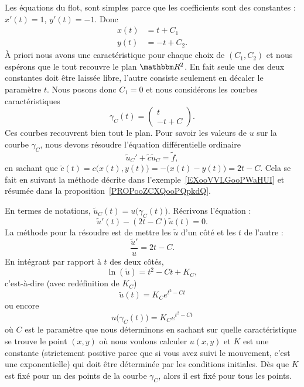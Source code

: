 Les équations du flot, sont simples parce que les coefficients sont des constantes : \( x'(t)=1\), \( y'(t)=-1\). Donc
\begin{subequations}
    \begin{align}
        x(t)&=t+C_1\\
        y(t)&=-t+C_2.
    \end{align}
\end{subequations}
À priori nous avons une caractéristique pour chaque choix de \( (C_1,C_2)\) et nous espérons que le tout recouvre le plan \( \eR^2\). En fait seule une des deux constantes doit être laissée libre, l'autre consiste seulement en décaler le paramètre \( t\). Nous posons donc \( C_1=0\) et nous considérons les courbes caractéristiques
\begin{equation}
    \gamma_C(t)=\begin{pmatrix}
        t    \\
        -t+C
    \end{pmatrix}.
\end{equation}
Ces courbes recouvrent bien tout le plan. Pour savoir les valeurs de \( u\) sur la courbe \( \gamma_C\), nous devons résoudre l'équation différentielle ordinaire
\begin{equation}
    \tilde u_C'+\tilde c\tilde u_C=\tilde f,
\end{equation}
en sachant que \( \tilde c(t)=c\big( x(t),y(t) \big)=-\big( x(t)-y(t) \big)=2t-C\). Cela se fait en suivant la méthode décrite dans l'exemple~\ref{EXooVVLGooPWaHUI} et résumée dans la proposition~\ref{PROPooZCXQooPQpkdQ}.

En termes de notations, \( \tilde u_C(t)=u\big( \gamma_C(t) \big)\). Récrivons l'équation :
\begin{equation}
    \tilde u'(t)-(2t-C)\tilde u(t)=0.
\end{equation}
La méthode pour la résoudre est de mettre les \( \tilde u\) d'un côté et les \( t\) de l'autre :
\begin{equation}
    \frac{ \tilde u' }{ u }=2t-C.
\end{equation}
En intégrant par rapport à \( t\) des deux côtés,
\begin{equation}
    \ln(\tilde u)=t^2-Ct+K_C,
\end{equation}
c'est-à-dire (avec redéfinition de \( K_C\))
\begin{equation}
    \tilde u(t)=K_C e^{t^2-Ct}
\end{equation}
ou encore
\begin{equation}   \label{EQooSSTJooEQfRnP}
    u\big( \gamma_C(t) \big)=K_C e^{t^2-Ct}
\end{equation}
où \( C\) est le paramètre que nous déterminons en sachant sur quelle caractéristique se trouve le point \( (x,y)\) où nous voulons calculer \( u(x,y)\) et \( K\) est une constante (strictement positive parce que si vous avez suivi le mouvement, c'est une exponentielle) qui doit être déterminée par les conditions initiales. Dès que \( K\) est fixé pour un des points de la courbe \( \gamma_C\), alors il est fixé pour tous les points.

